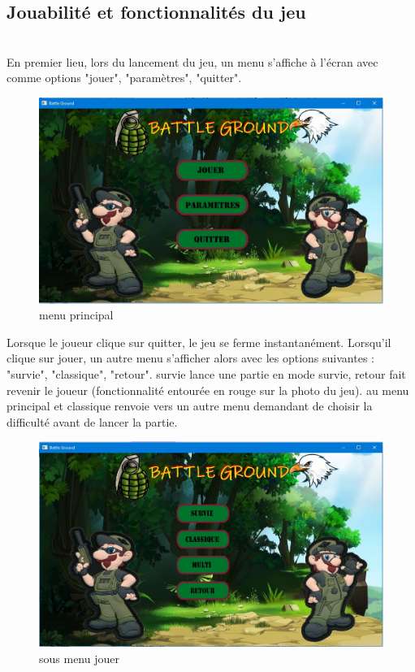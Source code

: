 \documentclass[a4paper,11pt]{article}
\begin{document}
\subsection {Jouabilité et fonctionnalités du jeu}
\\
En premier lieu, lors du lancement du jeu, un menu s'affiche à l'écran avec comme options "jouer", "paramètres", "quitter".
\begin{figure}[h!]
\centering
\includegraphics [width=1\textwidth]{image1.jpg} 
\caption {\label{image} menu principal}
\end{figure}
 \smallbreak
Lorsque le joueur clique sur quitter, le jeu se ferme instantanément. Lorsqu'il clique sur jouer, un autre menu s'afficher alors 
avec les options suivantes : "survie", "classique", "retour". survie lance une partie en mode survie, retour fait revenir le joueur (fonctionnalité entourée en rouge sur la photo du jeu).
au menu principal et classique renvoie vers un autre menu demandant de choisir la difficulté avant de lancer la partie.
\begin{figure}[h!]
\centering
\includegraphics [width=1\textwidth]{image2.jpg} 
\caption {\label{image} sous menu jouer}
\end{figure}
\end{document}
